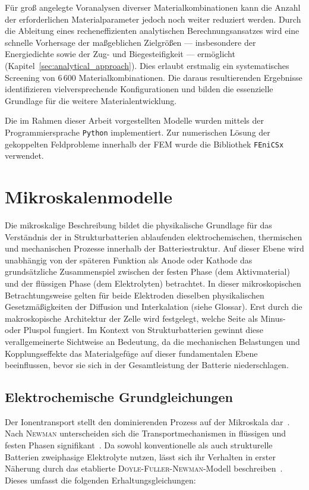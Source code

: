 Für groß angelegte Voranalysen diverser Materialkombinationen kann die Anzahl der erforderlichen Materialparameter jedoch noch weiter reduziert werden. Durch die Ableitung eines recheneffizienten analytischen Berechnungsansatzes wird eine schnelle Vorhersage der maßgeblichen Zielgrößen — insbesondere der Energiedichte sowie der Zug- und Biegesteifigkeit — ermöglicht (Kapitel~\ref{sec:analytical_approach}). Dies erlaubt erstmalig ein systematisches Screening von 6\,600 Materialkombinationen. Die daraus resultierenden Ergebnisse identifizieren vielversprechende Konfigurationen und bilden die essenzielle Grundlage für die weitere Materialentwicklung. 

Die im Rahmen dieser Arbeit vorgestellten Modelle wurden mittels der Programmiersprache \texttt{Python} implementiert. Zur numerischen Lösung der gekoppelten Feldprobleme innerhalb der FEM wurde die Bibliothek \texttt{FEniCSx} verwendet.


\section{\label{sec:existing_micro_models}Mikroskalenmodelle}

Die mikroskalige Beschreibung bildet die physikalische Grundlage für das Verständnis der in Strukturbatterien ablaufenden elektrochemischen, thermischen und mechanischen Prozesse innerhalb der Batteriestruktur. Auf dieser Ebene wird unabhängig von der späteren Funktion als Anode oder Kathode das grundsätzliche Zusammenspiel zwischen der festen Phase (dem Aktivmaterial) und der flüssigen Phase (dem Elektrolyten) betrachtet. In dieser mikroskopischen Betrachtungsweise gelten für beide Elektroden dieselben physikalischen Gesetzmäßigkeiten der Diffusion und Interkalation (siehe Glossar). Erst durch die makroskopische Architektur der Zelle wird festgelegt, welche Seite als Minus- oder Pluspol fungiert. Im Kontext von Strukturbatterien gewinnt diese verallgemeinerte Sichtweise an Bedeutung, da die mechanischen Belastungen und Kopplungseffekte das Materialgefüge auf dieser fundamentalen Ebene beeinflussen, bevor sie sich in der Gesamtleistung der Batterie niederschlagen.

\subsection{Elektrochemische Grundgleichungen}

Der Ionentransport stellt den dominierenden Prozess auf der Mikroskala dar~\cite{Carlstedt2019b}. Nach \textsc{Newman} unterscheiden sich die Transportmechanismen in flüssigen und festen Phasen signifikant~\cite{Newman2021}. Da sowohl konventionelle als auch strukturelle Batterien zweiphasige Elektrolyte nutzen, lässt sich ihr Verhalten in erster Näherung durch das etablierte \textsc{Doyle}-\textsc{Fuller}-\textsc{Newman}-Modell beschreiben~\cite{Plett2015}. Dieses umfasst die folgenden Erhaltungsgleichungen:

